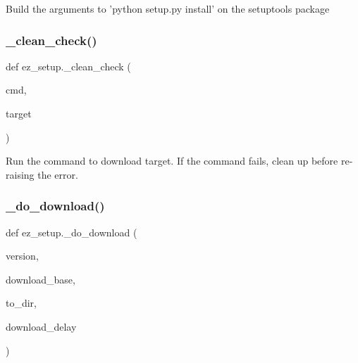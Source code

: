 \begin{DoxyVerb}Build the arguments to 'python setup.py install' on the setuptools package
\end{DoxyVerb}
 \mbox{\label{namespaceez__setup_acf457152772437248702139c6f95e99e}} 
\subsubsection{\texorpdfstring{\+\_\+clean\+\_\+check()}{\_clean\_check()}}
{\footnotesize\ttfamily def ez\+\_\+setup.\+\_\+clean\+\_\+check (\begin{DoxyParamCaption}\item[{}]{cmd,  }\item[{}]{target }\end{DoxyParamCaption})\hspace{0.3cm}{\ttfamily [private]}}

\begin{DoxyVerb}Run the command to download target. If the command fails, clean up before
re-raising the error.
\end{DoxyVerb}
 \mbox{\label{namespaceez__setup_ac2e3c82312a23add360687d835a87e72}} 
\subsubsection{\texorpdfstring{\+\_\+do\+\_\+download()}{\_do\_download()}}
{\footnotesize\ttfamily def ez\+\_\+setup.\+\_\+do\+\_\+download (\begin{DoxyParamCaption}\item[{}]{version,  }\item[{}]{download\+\_\+base,  }\item[{}]{to\+\_\+dir,  }\item[{}]{download\+\_\+delay }\end{DoxyParamCaption})\hspace{0.3cm}{\ttfamily [private]}}

\mbox{\label{namespaceez__setup_a5a316d95e7476fbc3323740274f5549b}} 
